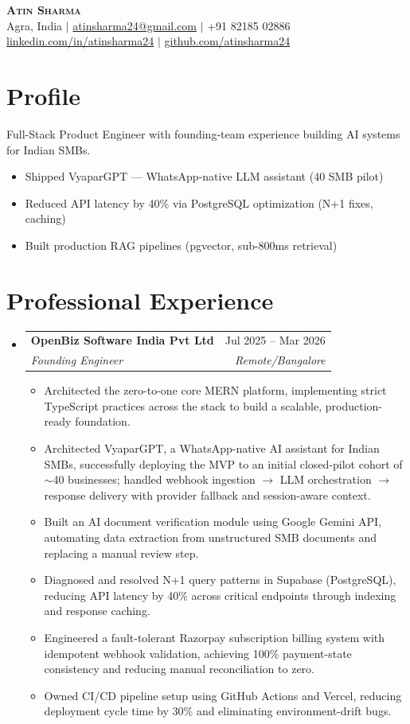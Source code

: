 \documentclass[a4paper,10pt]{article}
\makeatletter
\newcommand{\resumeItem}[1]{
  \item\small{{#1 \vspace{-2pt}}}
}
\newcommand{\resumeSubheading}[4]{
  \vspace{-2pt}\item
    \begin{tabular*}{\textwidth}{l@{\extracolsep{\fill}}r}
      \textbf{#1} & #2 \\
      \textit{\small#3} & \textit{\small #4} \\
    \end{tabular*}\vspace{-7pt}
}
\newcommand{\resumeSubHeadingListStart}{\begin{itemize}[leftmargin=0.15in, label={}]}
\newcommand{\resumeSubHeadingListEnd}{\end{itemize}}
\newcommand{\resumeItemListStart}{\begin{itemize}}
\newcommand{\resumeItemListEnd}{\end{itemize}\vspace{-5pt}}
\makeatother
\begin{document}
\begin{center}
    \textbf{\Huge \scshape Atin Sharma} \\ \vspace{1pt}
    \small Agra, India $|$ \href{mailto:atinsharma24@gmail.com}{atinsharma24@gmail.com} $|$ +91 82185 02886 \\
    \small \href{https://linkedin.com/in/atinsharma24}{linkedin.com/in/atinsharma24} $|$ \href{https://github.com/atinsharma24}{github.com/atinsharma24}
\end{center}

\section{Profile}
\vspace{2pt}
\small{Full-Stack Product Engineer with founding-team experience building AI systems for Indian SMBs.}
\vspace{-4pt}
\resumeItemListStart
    \resumeItem{Shipped VyaparGPT --- WhatsApp-native LLM assistant (40 SMB pilot)}
    \resumeItem{Reduced API latency by 40\% via PostgreSQL optimization (N+1 fixes, caching)}
    \resumeItem{Built production RAG pipelines (pgvector, sub-800ms retrieval)}
\resumeItemListEnd

\section{Professional Experience}
  \resumeSubHeadingListStart
    \resumeSubheading
      {OpenBiz Software India Pvt Ltd}{Jul 2025 -- Mar 2026}
      {Founding Engineer}{Remote/Bangalore}
      \resumeItemListStart
        \resumeItem{Architected the zero-to-one core MERN platform, implementing strict TypeScript practices across the stack to build a scalable, production-ready foundation.}
        \resumeItem{Architected VyaparGPT, a WhatsApp-native AI assistant for Indian SMBs, successfully deploying the MVP to an initial closed-pilot cohort of $\sim$40 businesses; handled webhook ingestion $\rightarrow$ LLM orchestration $\rightarrow$ response delivery with provider fallback and session-aware context.}
        \resumeItem{Built an AI document verification module using Google Gemini API, automating data extraction from unstructured SMB documents and replacing a manual review step.}
        \resumeItem{Diagnosed and resolved N+1 query patterns in Supabase (PostgreSQL), reducing API latency by 40\% across critical endpoints through indexing and response caching.}
        \resumeItem{Engineered a fault-tolerant Razorpay subscription billing system with idempotent webhook validation, achieving 100\% payment-state consistency and reducing manual reconciliation to zero.}
        \resumeItem{Owned CI/CD pipeline setup using GitHub Actions and Vercel, reducing deployment cycle time by 30\% and eliminating environment-drift bugs.}
      \resumeItemListEnd
  \resumeSubHeadingListEnd
\end{document}
